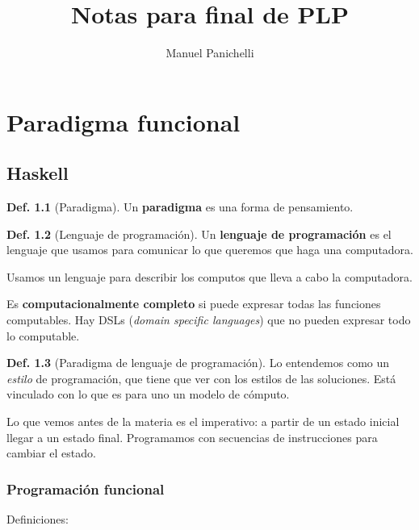 \documentclass{report}
\author{Manuel Panichelli}
\title{Notas para final de PLP}
\theoremstyle{definition} %
\newtheorem{definition}{Def.}[chapter]
\begin{document}
\maketitle

\tableofcontents

\chapter{Paradigma funcional}

\section{Haskell}

\begin{definition}[Paradigma]
    Un \textbf{paradigma} es una forma de pensamiento.
\end{definition}

\begin{definition}[Lenguaje de programación]
    Un \textbf{lenguaje de programación} es el lenguaje que usamos para
    comunicar lo que queremos que haga una computadora.

    Usamos un lenguaje para describir los computos que lleva a cabo la
    computadora.
    
    Es \textbf{computacionalmente completo} si puede expresar todas las
    funciones computables. Hay DSLs (\textit{domain specific languages}) que no
    pueden expresar todo lo computable.
\end{definition}

\begin{definition}[Paradigma de lenguaje de programación]
    Lo entendemos como un \textit{estilo} de programación, que tiene que ver con
    los estilos de las soluciones. Está vinculado con lo que es para uno un
    modelo de cómputo.

    Lo que vemos antes de la materia es el imperativo: a partir de un estado
    inicial llegar a un estado final. Programamos con secuencias de
    instrucciones para cambiar el estado.
\end{definition}

\subsection{Programación funcional}

Definiciones:
\end{document}
